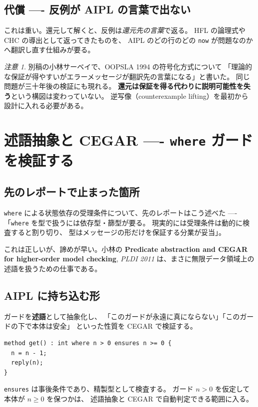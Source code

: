 \documentclass[11pt,a4paper]{ltjsarticle}
\theoremstyle{remark}
\newtheorem{remark}{注意}
\newcommand{\pp}[2]{\textbf{#1}, \emph{#2}}
\begin{document}
\subsection{代償 ---- 反例が AIPL の言葉で出ない}

これは重い。還元して解くと、反例は\emph{還元先の言葉}で返る。
HFL の論理式や CHC の導出として返ってきたものを、
AIPL のどの行のどの \texttt{now} が問題なのかへ翻訳し直す仕組みが要る。

\begin{remark}
別稿の小林サーベイで、OOPSLA 1994 の符号化方式について
「理論的な保証が得やすいがエラーメッセージが翻訳先の言葉になる」と書いた。
同じ問題が三十年後の検証にも現れる。
\textbf{還元は保証を得る代わりに説明可能性を失う}という構図は変わっていない。
逆写像（counterexample lifting）を最初から設計に入れる必要がある。
\end{remark}

\section{述語抽象と CEGAR ---- \texttt{where} ガードを検証する}

\subsection{先のレポートで止まった箇所}

\texttt{where} による状態依存の受理条件について、先のレポートはこう述べた
---- 「\texttt{where} を型で扱うには依存型・篩型が要る。
現実的には受理条件は動的に検査すると割り切り、
型はメッセージの形だけを保証する分業が妥当」。

これは正しいが、諦めが早い。小林の
\pp{Predicate abstraction and CEGAR for higher-order model checking}{PLDI 2011}
は、まさに無限データ領域上の述語を扱うための仕事である。

\subsection{AIPL に持ち込む形}

ガードを\textbf{述語}として抽象化し、
「このガードが永遠に真にならない」「このガードの下で本体は安全」
といった性質を CEGAR で検証する。

\begin{lstlisting}[language=AIPL]
method get() : int where n > 0 ensures n >= 0 {
  n = n - 1;
  reply(n);
}
\end{lstlisting}

\texttt{ensures} は事後条件であり、精製型として検査する。
ガード $n>0$ を仮定して本体が $n \ge 0$ を保つかは、
述語抽象と CEGAR で自動判定できる範囲に入る。
\end{document}

